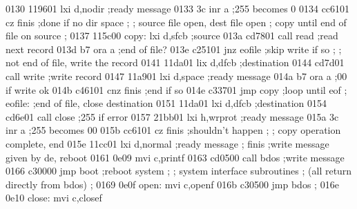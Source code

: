      0130 119601                          lxi  d,nodir   ;ready message
     0133 3c                              inr  a         ;255 becomes 0
     0134 cc6101                          cz   finis     ;done if no dir space
                                 ;
                                 ;        source file open, dest file open
                                 ;        copy until end of file on source
                                 ;
     0137 115c00                 copy:    lxi  d,sfcb    ;source
     013a cd7801                          call read      ;read next record
     013d b7                              ora  a         ;end of file?
     013e c25101                          jnz  eofile    ;skip write if so
                                 ;
                                 ;        not end of file, write the record
     0141 11da01                          lix  d,dfcb    ;destination
     0144 cd7d01                          call write     ;write record
     0147 11a901                          lxi  d,space   ;ready message
     014a b7                              ora  a         ;00 if write ok
     014b c46101                          cnz  finis     ;end if so
     014e c33701                          jmp  copy      ;loop until eof
                                 ;
                                 eofile:  ;end of file, close destination
     0151 11da01                          lxi  d,dfcb    ;destination
     0154 cd6e01                          call close     ;255 if error
     0157 21bb01                          lxi  h,wrprot  ;ready message
     015a 3c                              inr  a         ;255 becomes 00
     015b cc6101                          cz   finis     ;shouldn't happen
                                 ;
                                 ;        copy operation complete, end
     015e 11cc01                          lxi  d,normal  ;ready message
                                 ;
                                 finis    ;write message given by de, reboot
     0161 0e09                            mvi  c,printf
     0163 cd0500                          call bdos      ;write message
     0166 c30000                          jmp  boot      ;reboot system
                                 ;
                                 ;        system interface subroutines
                                 ;        (all return directly from bdos)
                                 ;
     0169 0e0f                   open:    mvi  c,openf
     016b c30500                          jmp  bdos
                                 ;
     016e 0e10                   close:   mvi  c,closef
